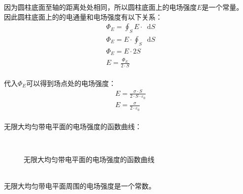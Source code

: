 \documentclass[UTF8]{ctexart}
\newcommand*{\dif}{\mathop{}\!\mathrm{d}}
\begin{document}
\newpage

    因为圆柱底面至轴的距离处处相同，所以圆柱底面上的电场强度$E$是一个常量。\\[3mm]
    因此圆柱底面上的的电通量和电场强度有以下关系：\vspace{3pt}
    \begin{align}
        &\Phi_E=\oint_S E\cdot\dif S\\[5mm]
        &\Phi_E=E\cdot\oint_S\dif S\\[5mm]
        &\Phi_E=E\cdot 2S\\[5mm]
        &E=\frac{\Phi_E}{2\cdot S}
    \end{align}\\
    代入$\Phi_E$可以得到场点处的电场强度：
    \begin{align}
        &E=\frac{\sigma\cdot S}{2\cdot S\cdot\varepsilon_0}\\[5mm]
        &E=\frac{\sigma}{2\cdot\varepsilon_0}
    \end{align}\\
    无限大均匀带电平面的电场强度的函数曲线：\vspace{3pt}
    \begin{figure}[h]
        \begin{center}
            ~~~~
            \caption{无限大均匀带电平面的电场强度的函数曲线}
        \end{center}
    \end{figure}\\
    无限大均匀带电平面周围的电场强度是一个常数。
\end{document}
